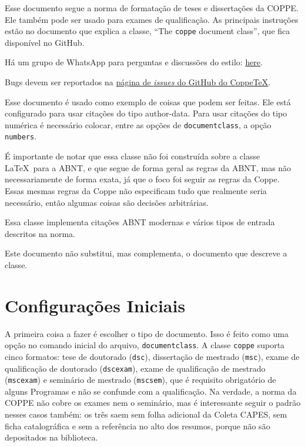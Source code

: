 \documentclass[dsc,pdfa]{coppe}
\begin{document}
  Esse documento segue a norma de formatação de teses e dissertações da COPPE. Ele também pode ser usado para exames de qualificação. As principais instruções estão no documento que explica a classe, ``The \verb|coppe| document class'', que fica disponível no GitHub.

  Há um grupo de WhatsApp para perguntas e discussões do estilo: \href{https://github.com/COPPE-UFRJ/CoppeTeX/wiki}{here}.

  Bugs devem ser reportados na \href{https://github.com/COPPE-UFRJ/CoppeTeX/issues}{página de \textit{issues} do GitHub do CoppeTeX}.

  Esse documento é usado como exemplo de coisas que podem ser feitas. Ele está configurado para usar citações do tipo author-data. Para usar citações do tipo numérica é necessário colocar, entre as opções de \verb|documentclass|, a opção \verb|numbers|.

  É importante de notar que essa classe não foi construída sobre a classe \LaTeX \  para a ABNT, e que segue de forma geral as regras da ABNT, mas não necessariamente de forma exata, já que o foco foi seguir as regras da Coppe. Essas mesmas regras da Coppe não especificam tudo que realmente seria necessário, então algumas coisas são decisões arbitrárias.

  Essa classe implementa citações ABNT modernas e vários tipos de entrada descritos na norma.

  Este documento não substitui, mas complementa, o documento que descreve a classe.

\chapter{Configurações Iniciais}

   A primeira coisa a fazer é escolher o tipo de documento. Isso é feito como uma opção no comando inicial do arquivo, \verb|documentclass|. A classe \verb|coppe| suporta cinco formatos: tese de doutorado (\verb|dsc|), dissertação de mestrado (\verb|msc|), exame de qualificação de doutorado (\verb|dscexam|), exame de qualificação de mestrado (\verb|mscexam|) e seminário de mestrado (\verb|mscsem|), que é requisito obrigatório de alguns Programas e não se confunde com a qualificação. Na verdade, a norma da COPPE não cobre os exames nem o seminário, mas é interessante seguir o padrão nesses casos também: os três saem sem folha adicional da Coleta CAPES, sem ficha catalográfica e sem a referência no alto dos resumos, porque não são depositados na biblioteca.
\end{document}
